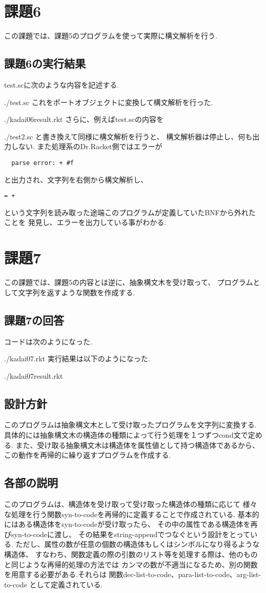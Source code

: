 \documentclass[a4j,dvipdfmx]{jarticle}
\begin{document}
\section{課題6}
この課題では、課題5のプログラムを使って実際に構文解析を行う.
\subsection{課題6の実行結果}
test.scに次のような内容を記述する.

{./test.sc}
これをポートオブジェクトに変換して構文解析を行った.

                {./kadai06result.rkt}
さらに、例えばtest.scの内容を

                {./test2.sc}
と書き換えて同様に構文解析を行うと、
構文解析器は停止し、何も出力しない.
また処理系のDr.Racket側ではエラーが
\begin{verbatim}
  parse error: + #f
\end{verbatim}
と出力され、文字列を右側から構文解析し、
\begin{verbatim}
= +
\end{verbatim}
という文字列を読み取った途端このプログラムが定義していたBNFから外れたことを
発見し、エラーを出力している事がわかる.
\section{課題7}
この課題では、課題5の内容とは逆に、抽象構文木を受け取って、
プログラムとして文字列を返すような関数を作成する.
\subsection{課題7の回答}
コードは次のようになった.

{./kadai07.rkt}
実行結果は以下のようになった.

{./kadai07result.rkt}
\subsection{設計方針}
このプログラムは抽象構文木として受け取ったプログラムを文字列に変換する.
具体的には抽象構文木の構造体の種類によって行う処理を１つずつcond文で定める.
また、受け取る抽象構文木は構造体を属性値として持つ構造体であるから、
この動作を再帰的に繰り返すプログラムを作成する.
\subsection{各部の説明}
このプログラムは、構造体を受け取って受け取った構造体の種類に応じて
様々な処理を行う関数syn-to-codeを再帰的に定義することで作成されている.
基本的にはある構造体をsyn-to-codeが受け取ったら、
その中の属性である構造体を再びsyn-to-codeに渡し、
その結果をstring-appendでつなぐという設計をとっている.
ただし、属性の数が任意の個数の構造体もしくはシンボルになり得るような構造体、
すなわち、関数定義の際の引数のリスト等を処理する際は、他のものと同じような再帰的処理の方法では
カンマの数が不適当になるため、別の関数を用意する必要がある.それらは
関数dec-list-to-code、para-list-to-code、arg-list-to-code
として定義されている.
\end{document}
